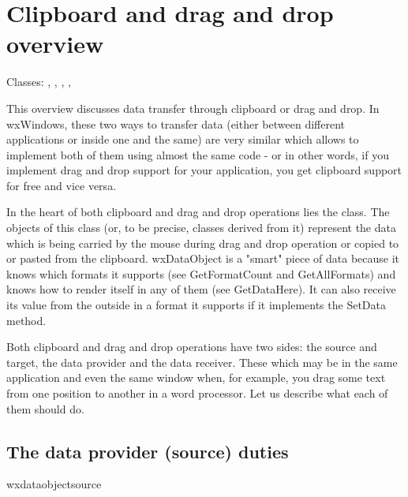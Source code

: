 
\section{Clipboard and drag and drop overview}\label{wxclipboardonfigoverview}

Classes: ,
 ,
 ,
 ,

This overview discusses data transfer through clipboard or drag and drop. In
wxWindows, these two ways to transfer data (either between different
applications or inside one and the same) are very similar which allows to
implement both of them using almost the same code - or in other
words, if you implement drag and drop support for your application, you get
clipboard support for free and vice versa.

In the heart of both clipboard and drag and drop operations lies the 
 class. The objects of this class (or, to be
precise, classes derived from it) represent the data which is being carried by
the mouse during drag and drop operation or copied to or pasted from the
clipboard. wxDataObject is a "smart" piece of data
because it knows which formats it supports (see 
GetFormatCount and GetAllFormats) and knows how to render
itself in any of them (see GetDataHere).
It can also receive its value from the outside in a format it supports if it
implements the SetData method.

Both clipboard and drag and drop operations have two sides: the source and
target, the data provider and the data receiver. These which may be in the same
application and even the same window when, for example, you drag some text from
one position to another in a word processor. Let us describe what each of them
should do.

\subsection{The data provider (source) duties}{wxdataobjectsource}

